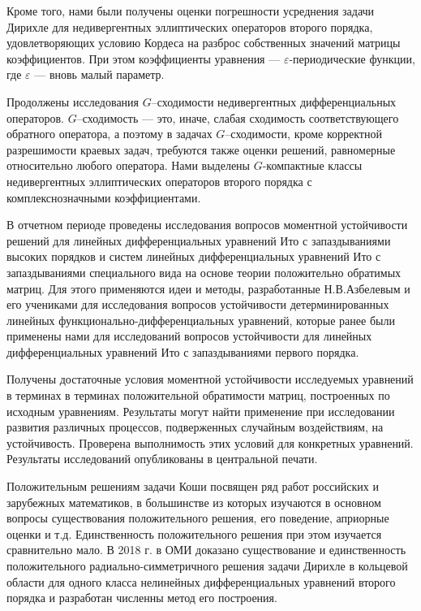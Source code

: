 Кроме того, нами были получены оценки погрешности усреднения задачи Дирихле для недивергентных эллиптических операторов второго порядка, удовлетворяющих условию Кордеса на разброс собственных значений матрицы коэффициентов. При этом коэффициенты уравнения --- $\varepsilon$-периодические функции, где $\varepsilon$ --- вновь малый параметр.




Продолжены исследования  $G$--сходимости недивергентных дифференциальных операторов. $G$--сходимость --- это, иначе, слабая сходимость
соответствующего обратного оператора, а поэтому в задачах $G$--сходимости, кроме корректной разрешимости краевых задач, требуются также оценки решений,
равномерные относительно любого оператора. Нами выделены $G$-компактные классы недивергентных эллиптических операторов второго порядка с комплекснозначными коэффициентами.







В отчетном периоде проведены исследования вопросов моментной устойчивости решений для линейных дифференциальных уравнений Ито с
запаздываниями высоких порядков и систем линейных дифференциальных уравнений Ито с запаздываниями специального вида на
основе теории положительно обратимых матриц. Для этого применяются идеи и методы, разработанные Н.В.Азбелевым и его
учениками для исследования вопросов устойчивости детерминированных линейных функционально-дифференциальных уравнений,
которые ранее были применены нами для исследований вопросов устойчивости для линейных дифференциальных уравнений Ито с
запаздываниями первого порядка. 

Получены достаточные условия моментной устойчивости исследуемых уравнений в терминах в терминах положительной обратимости матриц, построенных по исходным уравнениям. 
Результаты могут найти применение при исследовании развития различных процессов, подверженных случайным воздействиям, на  устойчивость. 
Проверена выполнимость этих условий для конкретных уравнений.
Результаты исследований опубликованы в центральной печати.









Положительным решениям задачи Коши посвящен ряд 
работ российских и зарубежных математиков, в большинстве из которых изучаются в основном
вопросы существования положительного решения, его поведение,
априорные оценки и т.д. 
Единственность положительного решения при этом изучается сравнительно мало.
В 2018 г. в ОМИ доказано существование и единственность положительного радиально-симметричного решения задачи Дирихле в кольцевой
области для одного класса нелинейных дифференциальных уравнений второго порядка и разработан численны метод его построения.






